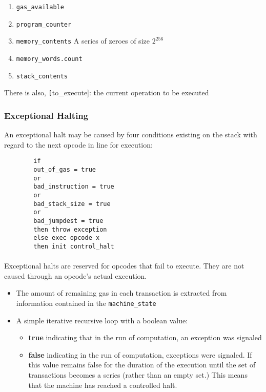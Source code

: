 \documentclass[10pt,a4paper,leqno,bibliography=totoc]{scrartcl}
\newenvironment{alphafootnotes}
{\par\edef\savedfootnotenumber{\number\value{footnote}}
\renewcommand{\thefootnote}{\alph{footnote}}
\setcounter{footnote}{0}}
{\par\setcounter{footnote}{\savedfootnotenumber}}
\begin{document}
\begin{alphafootnotes}
\begin{multicols*}{2}
		\begin{enumerate}
			\item \texttt{gas\_available}
			\item \texttt{program\_counter}
			\item \texttt{memory\_contents} A series of zeroes of size $2^{256}$
			\item \texttt{memory\_words.count}
			\item \texttt{stack\_contents}
		\end{enumerate}
		
		There is also, \texttt[to\_execute]: the current operation to be executed
		
		\subsubsection{Exceptional Halting}
		An exceptional halt may be caused by four conditions existing on the stack with regard to the next opcode in line for execution:
		
		\begin{verbatim}
		if 
		out_of_gas = true 
		or
		bad_instruction = true
		or
		bad_stack_size = true
		or
		bad_jumpdest = true
		then throw exception
		else exec opcode x
		then init control_halt
		\end{verbatim}	
		
		\paragraph{}Exceptional halts are reserved for opcodes that fail to execute. They are not caused through an opcode's actual execution.
		
		\begin{itemize}
			\item The amount of remaining gas in each transaction is extracted from information contained in the \texttt{machine\_state} 
			\item A simple iterative recursive  loop\supercite{Wood2017} with a boolean  value: 
		\begin{itemize}
				\item\textbf{true} indicating that in the run of computation, an exception was signaled
				\item\textbf{false} indicating in the run of computation, exceptions were signaled. If this value remains false for the duration of the execution until the set of transactions becomes a series (rather than an empty set.) This means that the machine has reached a controlled halt. 
			\end{itemize}
		\end{itemize}
    	

\end{multicols*}
\end{alphafootnotes}
\end{document}
